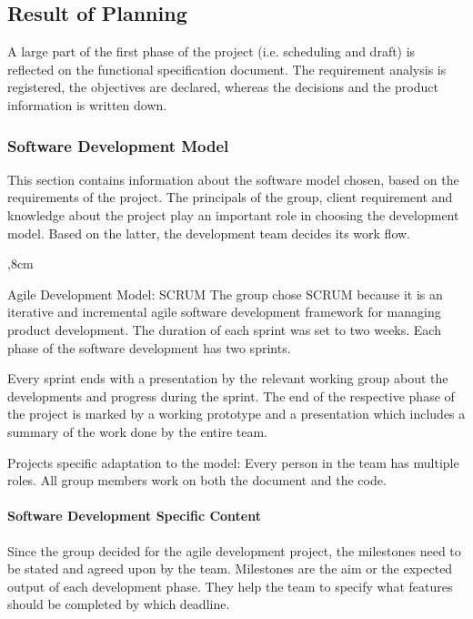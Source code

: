 \subsection{Result of Planning}
A large part of the first phase of the project (i.e. scheduling and draft) is reflected on the functional specification document. The requirement analysis is registered, the objectives are declared, whereas the decisions and the product information is written down.

\subsubsection{Software Development Model}

This section contains information about the software model chosen, based on the requirements of the project.
The principals of the group, client requirement and knowledge about the project play an important role in choosing the development model. Based on the latter, the development team decides its work flow. 

\begin{aims}
	,8cm
	\item[Agile Development Model: SCRUM] The group chose SCRUM because it is an iterative and incremental agile software development framework for managing product development. The duration of each sprint was set to two weeks. Each phase of the software development has two sprints. 
	
	Every sprint ends with a presentation by the relevant working group about the developments and progress during the sprint. The end of the respective phase of the project is marked by a working prototype and a presentation which includes a summary of the work done by the entire team. 
	
	\item[Projects specific adaptation to the model:] Every person in the team has multiple roles. All group members work on both the document and the code.
\end{aims} 

\paragraph{Software Development Specific Content}
Since the group decided for the agile development project, the milestones need to be stated and agreed upon by the team. Milestones are the aim or the expected output of each development phase. They help the team to specify what features should be completed by which deadline.

